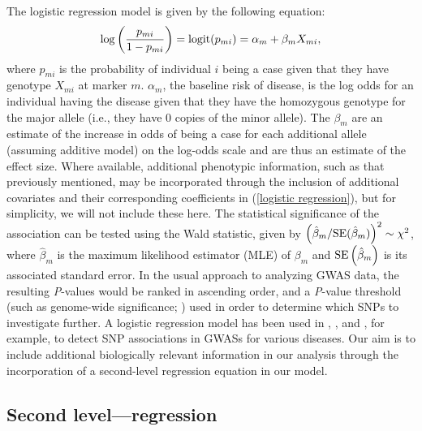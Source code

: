 \documentclass[oupdraft]{bio}
\begin{document}
The logistic regression model is given by the following
equation:
\begin{equation}
\log \left( \frac{p_{mi}}{1 - p_{mi}} \right)
= \hbox{logit} (p_{mi})
= \alpha_m + \beta_m X_{mi},
\label{logistic regression}
\end{equation}
where $p_{mi}$ is the probability of individual $i$ being a
case given that they have genotype $X_{mi}$ at marker $m$.
$\alpha_m$, the baseline risk of disease, is the log odds for
an individual having the disease given that they have the
homozygous genotype for the major allele (i.e., they have 0
copies of the minor allele). The $\beta_m$ are an estimate
of the increase in odds of being a case for each additional
allele (assuming additive model) on the log-odds scale and
are thus an estimate of the effect size. Where available,
additional phenotypic information, such as that previously
mentioned, may be incorporated through the inclusion of
additional covariates and their corresponding coefficients
in (\ref{logistic regression}), but for simplicity, we
will not include these here. The statistical significance
of the association can be tested using the Wald statistic,
given by
$\left( \hat{\beta}_m / \hbox{SE} (\hat{\beta}_m) \right)^2
\sim \chi^2$,
where $\hat{\beta}_m$ is the maximum likelihood estimator
(MLE) of $\beta_m$ and
$\hbox{SE} \left( \hat{\beta}_m \right)$
is its associated standard error. In the usual approach
to analyzing GWAS data, the resulting \textit{P}-values
would be ranked in ascending order, and a \textit{P}-value
threshold (such as genome-wide significance;
\citealp{Duditetal02})
used in order to determine which SNPs to investigate
further. A logistic regression model has been used in
\citet{rma2003},
\citet{LW2004},
and
\citet{rieger2004},
for example, to detect SNP associations in GWASs for
various diseases. Our aim is to include additional
biologically relevant information in our analysis through the
incorporation of a second-level regression equation in our model.


\subsection{Second level---regression}
\end{document}
